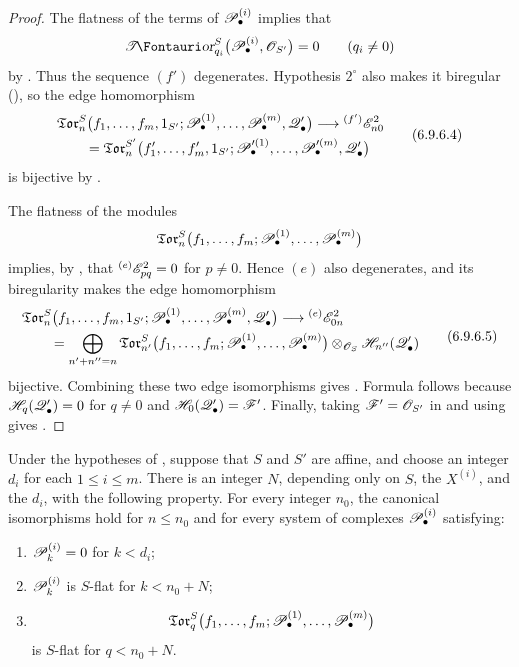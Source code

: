 \begin{proof}
The flatness of the terms of $\mathscr{P}_\bullet^{(i)}$ implies that
\[
  \shTor_{q_i}^S
  \bigl(
    \sh P_\bullet^{(i)},\sh O_{S'}
  \bigr)
  =
  0
  \qquad(q_i\neq0)
\]
by .  Thus the sequence $(f')$ degenerates.
Hypothesis $2^\circ$ also makes it biregular
(), so the edge homomorphism
\[
\begin{split}
  &
  \mathfrak{Tor}_n^S
  \bigl(
    f_1,\ldots,f_m,1_{S'};
    \sh P_\bullet^{(1)},\ldots,\sh P_\bullet^{(m)},
    \sh Q_\bullet'
  \bigr)
  \longrightarrow
  {}^{(f')}\sh E_{n0}^2
  \\
  &\qquad =
  \mathfrak{Tor}_n^{S'}
  \bigl(
    f_1',\ldots,f_m',1_{S'};
    \sh P_\bullet^{\prime(1)},\ldots,
    \sh P_\bullet^{\prime(m)},\sh Q_\bullet'
  \bigr)
\end{split}
  \tag{6.9.6.4}\label{III.6.9.6.4.eq}
\]
is bijective by .

The flatness of the modules
\[
  \mathfrak{Tor}_n^S
  \bigl(
    f_1,\ldots,f_m;
    \mathscr{P}_\bullet^{(1)},\ldots,\mathscr{P}_\bullet^{(m)}
  \bigr)
\]
implies, by , that
${}^{(e)}\mathscr{E}_{pq}^2=0$ for $p\neq0$.  Hence $(e)$ also
degenerates, and its biregularity makes the edge homomorphism
\[
\begin{split}
  &
  \mathfrak{Tor}_n^S
  \bigl(
    f_1,\ldots,f_m,1_{S'};
    \sh P_\bullet^{(1)},\ldots,\sh P_\bullet^{(m)},
    \sh Q_\bullet'
  \bigr)
  \longrightarrow
  {}^{(e)}\sh E_{0n}^2
  \\
  &\qquad =
  \bigoplus_{n'+n''=n}
  \mathfrak{Tor}_{n'}^S
  \bigl(
    f_1,\ldots,f_m;
    \sh P_\bullet^{(1)},\ldots,\sh P_\bullet^{(m)}
  \bigr)
  \otimes_{\sh O_S}
  \sh H_{n''}(\sh Q_\bullet')
\end{split}
  \tag{6.9.6.5}\label{III.6.9.6.5.eq}
\]
bijective.  Combining these two edge isomorphisms gives
.  Formula  follows because
$\mathscr{H}_q(\mathscr{Q}_\bullet')=0$ for $q\neq0$ and
$\mathscr{H}_0(\mathscr{Q}_\bullet')=\mathscr{F}'$.  Finally, taking
$\mathscr{F}'=\mathscr{O}_{S'}$ in  and using
 gives .
\end{proof}

\begin{corollary}[6.9.7]
\label{III.6.9.7}
Under the hypotheses of , suppose that $S$ and
$S'$ are affine, and choose an integer $d_i$ for each
$1\leq i\leq m$.  There is an integer $N$, depending only on $S$,
the $X^{(i)}$, and the $d_i$, with the following property.  For
every integer $n_0$, the canonical isomorphisms
 hold for $n\leq n_0$ and for every system of
complexes $\mathscr{P}_\bullet^{(i)}$ satisfying:
\begin{enumerate}
  \item[$1^\circ$] $\mathscr{P}_k^{(i)}=0$ for $k<d_i$;
  \item[$2^\circ$] $\mathscr{P}_k^{(i)}$ is $S$-flat for
  $k<n_0+N$;
  \item[$3^\circ$]
  \[
    \mathfrak{Tor}_q^S
    \bigl(
      f_1,\ldots,f_m;
      \mathscr{P}_\bullet^{(1)},\ldots,\mathscr{P}_\bullet^{(m)}
    \bigr)
  \]
  is $S$-flat for $q<n_0+N$.
\end{enumerate}
\end{corollary}

